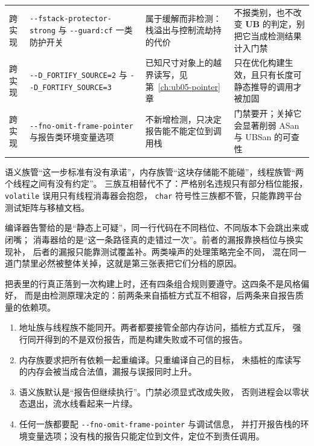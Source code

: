 \documentclass[12pt,a4paper,fontset=fandol]{ctexbook}
\newcommand{\Tp}[1]{\texttt{#1}}
\newcommand{\Opt}[1]{\texttt{-\/-#1}}
\newcommand{\Bk}{\discretionary{}{}{}}
\newcommand{\UB}{\textbf{\textsf{UB}}}
\newcommand{\Mx}[1]{\textsf{#1}}
\begin{document}
\begin{longtable}{@{}>{\raggedright\arraybackslash}p{} >{\raggedright\arraybackslash}p{} >{\raggedright\arraybackslash}p{} >{\raggedright\arraybackslash}p{}@{}}
跨实现 & \Opt{fstack-{\Bk}protector-{\Bk}strong} 与 \Opt{guard:cf} 一类防护开关 & 属于缓解而非检测：栈溢出与控制流劫持的代价 & 不报类别，也不改变 \UB{} 的判定，别把它当成检测结果计入门禁 \\
跨实现 & \Opt{D{\Bk}\_FORTIFY{\Bk}\_SOURCE=2} 与 \Opt{D{\Bk}\_FORTIFY{\Bk}\_SOURCE=3} & 已知尺寸对象上的越界读写，见 第~\ref{ch:ub05-pointer} 章 & 只在优化构建生效，且只有长度可静态推导的调用才被加固 \\
跨实现 & \Opt{fno-{\Bk}omit-{\Bk}frame-{\Bk}pointer} 与报告类环境变量选项 & 不新增检测，只决定报告能不能定位到调用栈 & 门禁要开；关掉它会显著削弱 \Mx{ASan} 与 \Mx{UBSan} 的可查性 \\
\end{longtable}

\begin{note}[title=三族开关的分工]
语义族管“这一步标准有没有承诺”，内存族管“这块存储能不能碰”，线程族管“两个线程之间有没有约定”。
三族互相替代不了：严格别名违规只有部分档位能报，\Tp{volatile} 误用只有线程消毒器会抱怨，
\Tp{char} 符号性三族都不管，只能靠跨平台测试矩阵与移植文档。
\end{note}

\begin{compare}[title=编译器告警与消毒器的差别]
编译器告警给的是“静态上可疑”，同一行代码在不同档位、不同版本下会跳出来或闭嘴；
消毒器给的是“这一条路径真的走错过一次”。前者的漏报靠换档位与换实现补，
后者的漏报只能靠测试覆盖补。两类噪声的处理策略完全不同，
混在同一道门禁里必然被整体关掉，这就是第三张表把它们分档的原因。
\end{compare}

把表里的行真正落到一次构建上时，还有四条组合规则要遵守。这四条不是风格偏好，
而是由检测原理决定的：前两条来自插桩方式互不相容，后两条来自报告质量的依赖项。

\begin{enumerate}
\item 地址族与线程族不能同开。两者都要接管全部内存访问，插桩方式互斥，
强行同开得到的不是双份报告，而是构建失败或不可信的报告。
\item 内存族要求把所有依赖一起重编译。只重编译自己的目标，
未插桩的库读写的内存会被当成合法值，漏报与误报同时上升。
\item 语义族默认是“报告但继续执行”。门禁必须显式改成失败，
否则进程会以零状态退出，流水线看起来一片绿。
\item 任何一族都要配 \Opt{fno-{\Bk}omit-{\Bk}frame-{\Bk}pointer} 与调试信息，
并打开报告栈的环境变量选项；没有栈的报告只能定位到文件，定位不到责任调用。
\end{enumerate}
\end{document}
